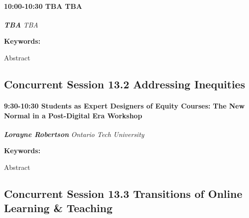 \documentclass[
]{book}
\begin{document}
\begin{session}
\hypertarget{tba-tba}{%
\paragraph*{\texorpdfstring{10:00-10:30 \textbar{} \textbf{TBA}
\textbar{}
TBA}{10:00-10:30 \textbar{} TBA \textbar{} TBA}}\label{tba-tba}}

\textbf{\emph{TBA}} \textbar{} \emph{TBA}

\textbf{Keywords:}

Abstract
\end{session}

\hypertarget{concurrent-session-13.2-addressing-inequities}{%
\subsection*{Concurrent Session 13.2 \textbar{} Addressing Inequities}\label{concurrent-session-13.2-addressing-inequities}}

\begin{workshop}
\hypertarget{students-as-expert-designers-of-equity-courses-the-new-normal-in-a-post-digital-era-workshop}{%
\paragraph*{\texorpdfstring{9:30-10:30 \textbar{} \textbf{Students as
Expert Designers of Equity Courses: The New Normal in a Post-Digital
Era} \textbar{}
Workshop}{9:30-10:30 \textbar{} Students as Expert Designers of Equity Courses: The New Normal in a Post-Digital Era \textbar{} Workshop}}\label{students-as-expert-designers-of-equity-courses-the-new-normal-in-a-post-digital-era-workshop}}

\textbf{\emph{Lorayne Robertson}} \textbar{} \emph{Ontario Tech
University}

\textbf{Keywords:}

Abstract
\end{workshop}

\hypertarget{concurrent-session-13.3-transitions-of-online-learning-teaching}{%
\subsection*{Concurrent Session 13.3 \textbar{} Transitions of Online Learning \& Teaching}\label{concurrent-session-13.3-transitions-of-online-learning-teaching}}
\end{document}
